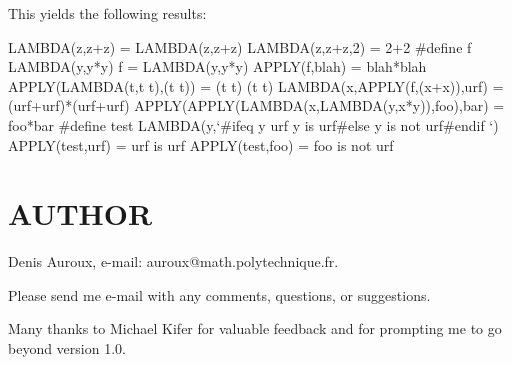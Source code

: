 This yields the following results: 

\begin{PRE}
  LAMBDA(z,z+z)
    ={\htmlGt} LAMBDA(z,z+z)
  LAMBDA(z,z+z,2)
    ={\htmlGt} 2+2
  \#define f LAMBDA(y,y*y)
  f
    ={\htmlGt} LAMBDA(y,y*y)
  APPLY(f,blah)
    ={\htmlGt} blah*blah
  APPLY(LAMBDA(t,t t),(t t))
    ={\htmlGt} (t t) (t t)
  LAMBDA(x,APPLY(f,(x+x)),urf)
    ={\htmlGt} (urf+urf)*(urf+urf)
  APPLY(APPLY(LAMBDA(x,LAMBDA(y,x*y)),foo),bar)
    ={\htmlGt} foo*bar
  \#define test LAMBDA(y,`\#ifeq y urf
  y is urf\#else
  y is not urf\#endif
  `)
  APPLY(test,urf)
    ={\htmlGt} urf is urf
  APPLY(test,foo)
    ={\htmlGt} foo is not urf
\end{PRE}

\htmlHR

\section{AUTHOR}

Denis Auroux, e-mail: auroux@math.polytechnique.fr. 

Please send me e-mail with any comments, questions, or suggestions. 

Many thanks to Michael Kifer for valuable feedback and for prompting me to go
beyond version 1.0. 

